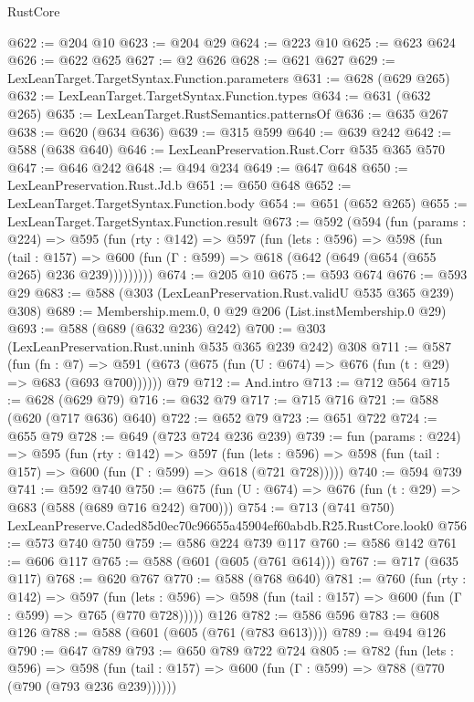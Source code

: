 \begin{lexlean}{RustCore}
\begin{coremodule}
@622 := @204 @10
@623 := @204 @29
@624 := @223 @10
@625 := @623 @624
@626 := @622 @625
@627 := @2 @626
@628 := @621 @627
@629 := LexLeanTarget.TargetSyntax.Function.parameters
@631 := @628 (@629 @265)
@632 := LexLeanTarget.TargetSyntax.Function.types
@634 := @631 (@632 @265)
@635 := LexLeanTarget.RustSemantics.patternsOf
@636 := @635 @267
@638 := @620 (@634 @636)
@639 := @315 @599
@640 := @639 @242
@642 := @588 (@638 @640)
@646 := LexLeanPreservation.Rust.Corr @535 @365 @570
@647 := @646 @242
@648 := @494 @234
@649 := @647 @648
@650 := LexLeanPreservation.Rust.Jd.b
@651 := @650 @648
@652 := LexLeanTarget.TargetSyntax.Function.body
@654 := @651 (@652 @265)
@655 := LexLeanTarget.TargetSyntax.Function.result
@673 := @592
    (@594
      (fun (params : @224) =>
      @595
        (fun (rty : @142) =>
        @597
          (fun (lets : @596) =>
          @598
            (fun (tail : @157) =>
            @600 (fun (Γ : @599) => @618 (@642 (@649 (@654 (@655 @265) @236 @239)))))))))
@674 := @205 @10
@675 := @593 @674
@676 := @593 @29
@683 := @588 (@303 (LexLeanPreservation.Rust.validU @535 @365 @239) @308)
@689 := Membership.mem.{0, 0} @29 @206 (List.instMembership.{0} @29)
@693 := @588 (@689 (@632 @236) @242)
@700 := @303 (LexLeanPreservation.Rust.uninh @535 @365 @239 @242) @308
@711 := @587
    (fun (fn : @7) =>
    @591 (@673 (@675 (fun (U : @674) => @676 (fun (t : @29) => @683 (@693 @700))))))
    @79
@712 := And.intro
@713 := @712 @564
@715 := @628 (@629 @79)
@716 := @632 @79
@717 := @715 @716
@721 := @588 (@620 (@717 @636) @640)
@722 := @652 @79
@723 := @651 @722
@724 := @655 @79
@728 := @649 (@723 @724 @236 @239)
@739 := fun (params : @224) =>
  @595
    (fun (rty : @142) =>
    @597
      (fun (lets : @596) => @598 (fun (tail : @157) => @600 (fun (Γ : @599) => @618 (@721 @728)))))
@740 := @594 @739
@741 := @592 @740
@750 := @675 (fun (U : @674) => @676 (fun (t : @29) => @683 (@588 (@689 @716 @242) @700)))
@754 := @713 (@741 @750) LexLeanPreserve.Caded85d0ec70c96655a45904ef60abdb.R25.RustCore.look0
@756 := @573 @740 @750
@759 := @586 @224 @739 @117
@760 := @586 @142
@761 := @606 @117
@765 := @588 (@601 (@605 (@761 @614)))
@767 := @717 (@635 @117)
@768 := @620 @767
@770 := @588 (@768 @640)
@781 := @760
    (fun (rty : @142) =>
    @597
      (fun (lets : @596) => @598 (fun (tail : @157) => @600 (fun (Γ : @599) => @765 (@770 @728)))))
    @126
@782 := @586 @596
@783 := @608 @126
@788 := @588 (@601 (@605 (@761 (@783 @613))))
@789 := @494 @126
@790 := @647 @789
@793 := @650 @789 @722 @724
@805 := @782
    (fun (lets : @596) =>
    @598 (fun (tail : @157) => @600 (fun (Γ : @599) => @788 (@770 (@790 (@793 @236 @239))))))

\end{coremodule}
\end{lexlean}
